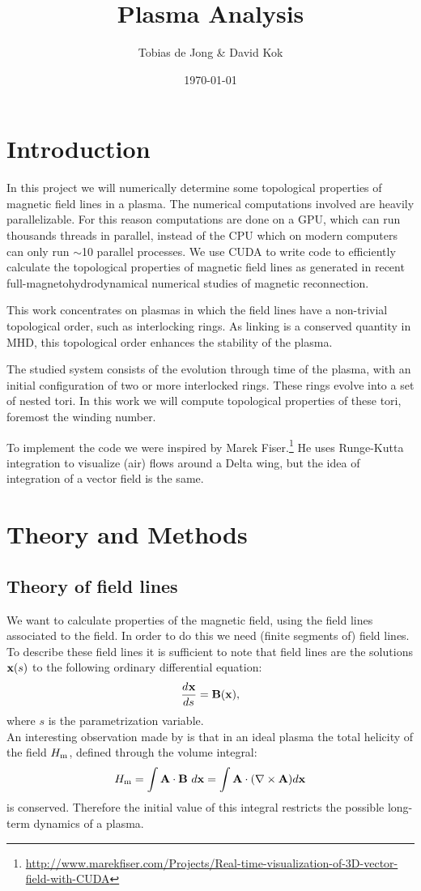 \documentclass[a4paper]{article}
\newcommand{\Dif}[3][ ]{\ensuremath{\frac{d^{#1} #2}{{d #3}^{#1}}}}
\renewcommand{\vec}{\bold}
\begin{document}
\title{Plasma Analysis}
\author{Tobias de Jong \& David Kok}
\date{\today}
\maketitle

\section{Introduction}
In this project we will numerically determine some topological properties of magnetic field lines in a plasma.
The numerical computations involved are heavily parallelizable. 
For this reason computations are done on a GPU, which can run thousands threads in parallel, instead of the CPU which on modern computers can only run $\sim$10 parallel processes.
We use CUDA to write code to efficiently calculate the topological properties of magnetic field lines as generated in recent full-magnetohydrodynamical numerical studies of magnetic reconnection.~\cite{PhysRevLett.115.095001}

This work concentrates on plasmas in which the field lines have a non-trivial topological order, such as interlocking rings. 
As linking is a conserved quantity in MHD, this topological order enhances the stability of the plasma.

The studied system consists of the evolution through time of the plasma, with an initial configuration of two or more interlocked rings. These rings evolve into a set of nested tori.
In this work we will compute topological properties of these tori, foremost the winding number.

To implement the code we were inspired by Marek Fiser.\footnote{\url{http://www.marekfiser.com/Projects/Real-time-visualization-of-3D-vector-field-with-CUDA}} He uses Runge-Kutta integration to visualize (air) flows around a Delta wing, but the idea of integration of a vector field is the same.

\section{Theory and Methods}
\subsection{Theory of field lines}
We want to calculate properties of the magnetic field, using the field lines associated to the field. In order to do this we need (finite segments of) field lines. To describe these field lines it is sufficient to note that field lines are the solutions $\vec x(s)$ to the following ordinary differential equation:
\[\Dif{\vec x}{s} = \vec B(\vec x),\]
where $s$ is the parametrization variable.\\
An interesting observation made by \cite{taylor1986relaxation} is that in an ideal plasma the total helicity of the field $H_{\text m}$, defined through the volume integral:
\[
	H_{\text m} = \int\vec{A}\cdot\vec{B}\ d\vec{x} = \int\vec{A}\cdot (\nabla\times\vec{A})d\vec{x}
\]
is conserved. Therefore the initial value of this integral restricts the possible long-term dynamics of a plasma. 
\end{document}
